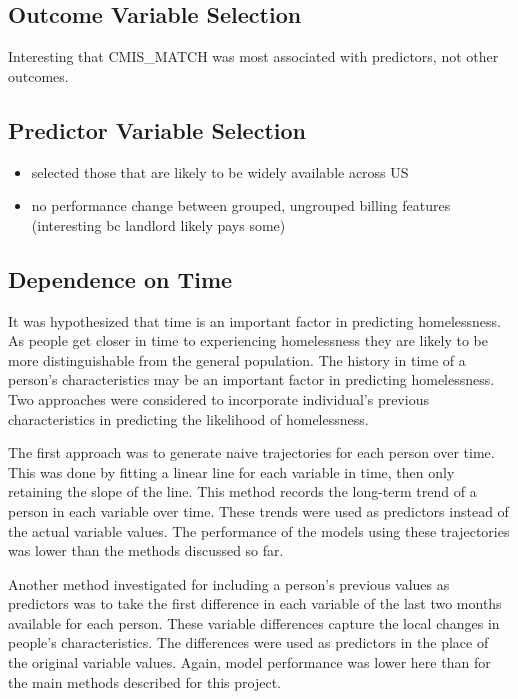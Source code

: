 \documentclass[10pt,letterpaper]{article}
\begin{document}
\subsection*{Outcome Variable Selection}
Interesting that CMIS\_MATCH was most associated with predictors, not other outcomes.

\subsection*{Predictor Variable Selection}
\begin{itemize}
    \item selected those that are likely to be widely available across US
    \item no performance change between grouped, ungrouped billing features (interesting bc landlord likely pays some)
\end{itemize}

\subsection*{Dependence on Time}
It was hypothesized that time is an important factor in predicting homelessness. As people get closer in time to experiencing homelessness they are likely to be more distinguishable from the general population. The history in time of a person's characteristics may be an important factor in predicting homelessness. Two approaches were considered to incorporate individual's previous characteristics in predicting the likelihood of homelessness.

The first approach was to generate naive trajectories for each person over time. This was done by fitting a linear line for each variable in time, then only retaining the slope of the line. This method records the long-term trend of a person in each variable over time. These trends were used as predictors instead of the actual variable values. The performance of the models using these trajectories was lower than the methods discussed so far.

Another method investigated for including a person's previous values as predictors was to take the first difference in each variable of the last two months available for each person. These variable differences capture the local changes in people's characteristics. The differences were used as predictors in the place of the original variable values. Again, model performance was lower here than for the main methods described for this project.
\end{document}
